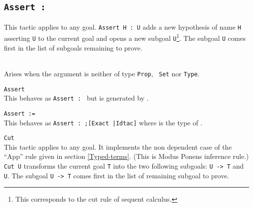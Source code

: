 \subsection{\tt Assert {\ident} : {\form}}
This tactic applies to any goal. {\tt Assert H : U} adds a new
hypothesis of name \texttt{H} asserting \texttt{U} to the current goal
and opens a new subgoal \texttt{U}\footnote{This corresponds to the cut rule of sequent calculus.}. The subgoal {\texttt U} comes first in the list of
subgoals remaining to prove.

\begin{ErrMsgs}
\item {}\\
  Arises when the argument {\form} is neither of type {\tt Prop}, {\tt
    Set} nor {\tt Type}.
\end{ErrMsgs}

\begin{Variants}
\item{\tt Assert {\form}}\\
  This behaves as {\tt Assert {\ident} : {\form}} but {\ident} is
  generated by {\Coq}.

\item{\tt Assert {\ident} := {\term}}\\
  This behaves as {\tt Assert {\ident} : {\type};[Exact
{\term}|Idtac]} where {\type} is the type of {\term}.

\item {\tt Cut {\form}} \\
  This tactic applies to any goal. It implements the non dependent
  case of the ``App'' rule given in section
  \ref{Typed-terms}. (This is Modus Ponens inference rule.)
  {\tt Cut U} transforms the current goal \texttt{T} 
  into the two following subgoals: {\tt U -> T} and \texttt{U}.
  The subgoal {\tt U -> T} comes first in the list of remaining
  subgoal to prove. 
\end{Variants}


